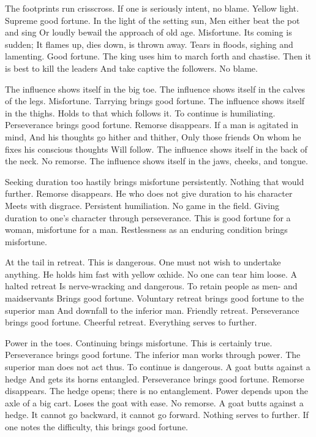 {The footprints run crisscross.
 If one is seriously intent, no blame.}
{Yellow light. Supreme good fortune.}
{In the light of the setting sun,
 Men either beat the pot and sing
 Or loudly bewail the approach of old age.
 Misfortune.}
{Its coming is sudden;
 It flames up, dies down, is thrown away.}
{Tears in floods, sighing and lamenting.
 Good fortune.}
{The king uses him to march forth and chastise.
 Then it is best to kill the leaders
 And take captive the followers. No blame.}

{The influence shows itself in the big toe.}
{The influence shows itself in the calves of the legs.
 Misfortune.
 Tarrying brings good fortune.}
{The influence shows itself in the thighs.
 Holds to that which follows it.
 To continue is humiliating.}
{Perseverance brings good fortune.
 Remorse disappears.
 If a man is agitated in mind,
 And his thoughts go hither and thither,
 Only those friends
 On whom he fixes his conscious thoughts
 Will follow.}
{The influence shows itself in the back of the neck.
 No remorse.}
{The influence shows itself in the jaws, cheeks, and tongue.}

{Seeking duration too hastily brings misfortune persistently.
 Nothing that would further.}
{Remorse disappears.}
{He who does not give duration to his character
 Meets with disgrace.
 Persistent humiliation.}
{No game in the field.}
{Giving duration to one’s character through perseverance.
 This is good fortune for a woman, misfortune for a man.}
{Restlessness as an enduring condition brings misfortune.}

{At the tail in retreat. This is dangerous.
 One must not wish to undertake anything.}
{He holds him fast with yellow oxhide.
 No one can tear him loose.}
{A halted retreat
 Is nerve-wracking and dangerous.
 To retain people as men- and maidservants
 Brings good fortune.}
{Voluntary retreat brings good fortune to the superior man
 And downfall to the inferior man.}
{Friendly retreat. Perseverance brings good fortune.}
{Cheerful retreat. Everything serves to further.}

{Power in the toes.
 Continuing brings misfortune.
 This is certainly true.}
{Perseverance brings good fortune.}
{The inferior man works through power.
 The superior man does not act thus.
 To continue is dangerous.
 A goat butts against a hedge
 And gets its horns entangled.}
{Perseverance brings good fortune.
 Remorse disappears.
 The hedge opens; there is no entanglement.
 Power depends upon the axle of a big cart.}
{Loses the goat with ease.
 No remorse.}
{A goat butts against a hedge.
 It cannot go backward, it cannot go forward.
 Nothing serves to further.
 If one notes the difficulty, this brings good fortune.}


